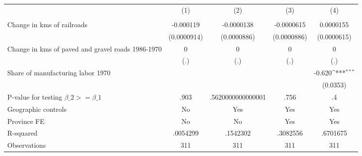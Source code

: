 {
\def\sym#1{\ifmmode^{#1}\else\(^{#1}\)\fi}
\begin{tabular}{l*{4}{c}}
\hline\hline
                &\multicolumn{1}{c}{(1)}&\multicolumn{1}{c}{(2)}&\multicolumn{1}{c}{(3)}&\multicolumn{1}{c}{(4)}\\
                &\multicolumn{1}{c}{}&\multicolumn{1}{c}{}&\multicolumn{1}{c}{}&\multicolumn{1}{c}{}\\
\hline
Change in kms of railroads&-0.000119         &-0.0000138         &-0.0000615         &0.0000155         \\
                &(0.0000914)         &(0.0000886)         &(0.0000886)         &(0.0000615)         \\
[1em]
Change in kms of paved and gravel roads 1986-1970&        0         &        0         &        0         &        0         \\
                &      (.)         &      (.)         &      (.)         &      (.)         \\
[1em]
Share of manufacturing labor 1970&                  &                  &                  &   -0.620\sym{***}\\
                &                  &                  &                  & (0.0353)         \\
\hline
P-value for testing $\beta\_{2} >= \beta\_{1}$&     .903         &.5620000000000001         &     .756         &       .4         \\
Geographic controls&       No         &      Yes         &      Yes         &      Yes         \\
Province FE     &       No         &       No         &      Yes         &      Yes         \\
R-squared       & .0054299         & .1542302         & .3082556         & .6701675         \\
Observations    &      311         &      311         &      311         &      311         \\
\hline\hline
\end{tabular}
}
